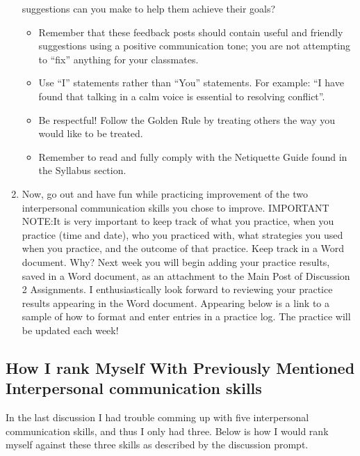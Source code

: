 \documentclass[stu,12pt]{apa7}
\begin{document}
\begin{enumerate}
          suggestions can you make to help them achieve their goals?
          \begin{itemize}
            \item Remember that these feedback posts should contain useful and
              friendly suggestions using a positive communication tone; you are
              not attempting to “fix” anything for your classmates.
            \item Use “I” statements rather than “You” statements. For example:
              ``I have found that talking in a calm voice is essential to
              resolving conflict''.
            \item Be respectful! Follow the Golden Rule by treating others the
              way you would like to be treated.
            \item Remember to read and fully comply with the Netiquette Guide
              found in the Syllabus section.
          \end{itemize}
        \item Now, go out and have fun while practicing improvement of the two
          interpersonal communication skills you chose to improve. IMPORTANT
          NOTE:\@ It is very important to keep track of what you practice, when
          you practice (time and date), who you practiced with, what strategies
          you used when you practice, and the outcome of that practice. Keep
          track in a Word document. Why? Next week you will begin adding your
          practice results, saved in a Word document, as an attachment to the
          Main Post of Discussion 2 Assignments. I enthusiastically look forward
          to reviewing your practice results appearing in the Word document.
          Appearing below is a link to a sample of how to format and enter
          entries in a practice log. The practice will be updated each week!
      \end{enumerate}

    \newpage
    \subsection{How I rank Myself With Previously Mentioned Interpersonal %
      communication skills}
      In the last discussion I had trouble comming up with five interpersonal
        communication skills, and thus I only had three. Below is how I would
        rank myself against these three skills as described by the discussion
        prompt.
\end{document}
